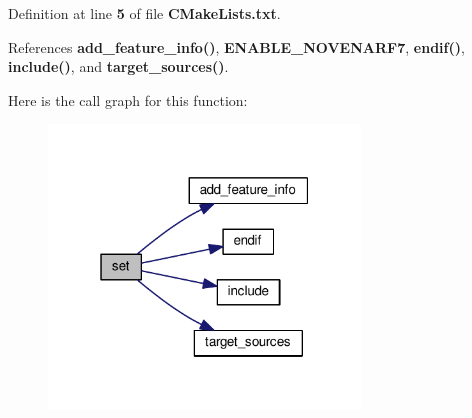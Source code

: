 Definition at line {\bf 5} of file {\bf C\+Make\+Lists.\+txt}.



References {\bf add\+\_\+feature\+\_\+info()}, {\bf E\+N\+A\+B\+L\+E\+\_\+\+N\+O\+V\+E\+N\+A\+R\+F7}, {\bf endif()}, {\bf include()}, and {\bf target\+\_\+sources()}.



Here is the call graph for this function\+:
\nopagebreak
\begin{figure}[H]
\begin{center}
\leavevmode
\includegraphics[width=235pt]{d2/d60/src_2ConnectionNovenaRF7_2CMakeLists_8txt_ae12046caeed448f74c25bb8979b47774_cgraph}
\end{center}
\end{figure}


